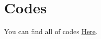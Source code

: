 \documentclass[12pt	]{article}
\begin{document}
\section{Codes}
You can find all of codes \href{https://github.com/M-Sc-AUT/M.Sc-Computer-Architecture/tree/main/Dependable%20System%20Design/Project/Project1}{Here}.

\newpage
 
 
\end{document}
